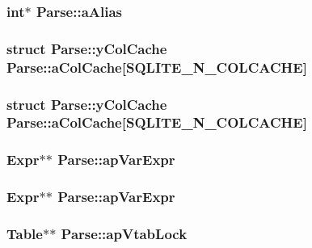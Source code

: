 \subsubsection{\setlength{\rightskip}{0pt plus 5cm}int$\ast$ \bf{Parse::a\-Alias}}\label{structParse_00094d46de40943645d581bf9da8094f}


\subsubsection{\setlength{\rightskip}{0pt plus 5cm}struct \bf{Parse::y\-Col\-Cache}  \bf{Parse::a\-Col\-Cache}[SQLITE\_\-N\_\-COLCACHE]}\label{structParse_816c2b5c48b8fadf15ea54e260b415bc}


\subsubsection{\setlength{\rightskip}{0pt plus 5cm}struct \bf{Parse::y\-Col\-Cache}  \bf{Parse::a\-Col\-Cache}[SQLITE\_\-N\_\-COLCACHE]}\label{structParse_816c2b5c48b8fadf15ea54e260b415bc}


\subsubsection{\setlength{\rightskip}{0pt plus 5cm}\bf{Expr}$\ast$$\ast$ \bf{Parse::ap\-Var\-Expr}}\label{structParse_67299b2e5184eb042bf45b30705718c2}


\subsubsection{\setlength{\rightskip}{0pt plus 5cm}\bf{Expr}$\ast$$\ast$ \bf{Parse::ap\-Var\-Expr}}\label{structParse_67299b2e5184eb042bf45b30705718c2}


\subsubsection{\setlength{\rightskip}{0pt plus 5cm}\bf{Table}$\ast$$\ast$ \bf{Parse::ap\-Vtab\-Lock}}\label{structParse_8b6c66ec846924e2638530a0ed583019}


